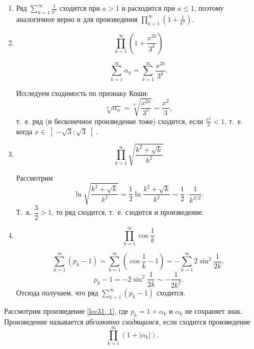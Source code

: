 \documentclass[../../main.tex]{subfiles}
\begin{document}
	\begin{examples}

		\;
	
		\begin{enumerate}
			\item Ряд $\sum\limits_{k = 1}^{\infty} \frac{1}{k^a}$ сходится при $a > 1$ и 
			расходится при $a \leq 1$, поэтому аналогичное верно и для произведения 
			$\prod\limits_{k = 1}^{\infty} \left(1 + \frac{1}{k^a}\right)$.
			
			\item \[\prod\limits_{k = 1}^{\infty} \left(1 + \frac{x^{2k}}{3^k}\right)\]
			
			\[\sum\limits_{k = 1}^{\infty}\alpha_k = \sum\limits_{k = 1}^{\infty} 
			\frac{x^{2k}}{3^k}.\]
			
			Исследуем сходимость по признаку Коши: \[\sqrt[n]{\alpha_n} = 
			\sqrt[n]{\frac{x^{2n}}{3^n}} = \frac{x^2}{3},\] т.~е. ряд (и бесконечное 
			произведение тоже) сходится, если $\frac{x^2}{3} < 1$, т.~е. когда ${x \in 
			\left]-\sqrt{3}; \sqrt{3}\right[}.$
			
			\item \[\prod\limits_{k = 1}^{\infty} \sqrt{\frac{k^2 + \sqrt{k}}{k^2}}\]
			
			Рассмотрим \[\ln\sqrt{\frac{k^2 + \sqrt{k}}{k^2}} = \frac{1}{2}\ln\frac{k^2 
			+ \sqrt{k}}{k^2} \sim \frac{1}{2} \cdot \frac{1}{k^{3/2}}.\] Т.~к. 
			$\dfrac{3}{2} > 1$, то ряд сходится, т.~е. 
			сзодится и произведение.
			
			\item \[\prod\limits_{k = 1}^{\infty} \cos\frac{1}{k}\]
			
			\[\sum\limits_{k = 1}^{\infty}(p_k - 1) = \sum\limits_{k = 1}^{\infty} 
			(\cos\frac{1}{k} - 1) = -\sum\limits_{k = 1}^{\infty}2\sin^2\frac{1}{2k},\]
			\[p_k - 1 = -2\sin^2\frac{1}{2k} \sim -\frac{1}{2k^2}.\] Отсюда получаем, что ряд
			$\sum\limits_{k = 1}^{\infty}(p_k - 1)$ сходится.
		\end{enumerate}	
	\end{examples}

	Рассмотрим произведение \eqref{lec31, 1}, где $p_k = 1 + \alpha_k$ и 
	$\alpha_k$ не сохраняет знак. Произведение называется \emph{абсолютно сходящимся}, 
	если сходится произведение
	\begin{equation} \label{lec31, 6}
	 \prod\limits_{k = 1}^{\infty} (1 + |\alpha_k|).
	\end{equation}
	
\end{document}
